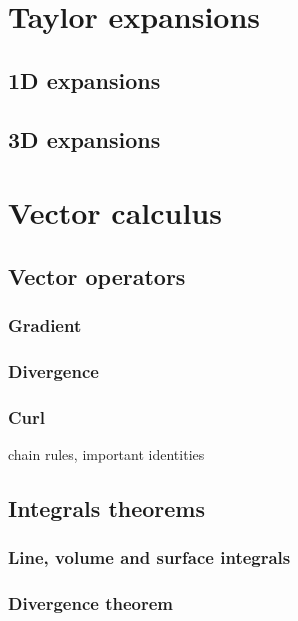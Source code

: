 \documentclass{article}
\begin{document}
\newpage

\section{Taylor expansions}

\subsection{1D expansions}

\newpage

\subsection{3D expansions}

\newpage

\section{Vector calculus}

\subsection{Vector operators}

\subsubsection{Gradient}

\subsubsection{Divergence}

\subsubsection{Curl}

chain rules, important identities

\subsection{Integrals theorems}

\subsubsection{Line, volume and surface integrals}

\subsubsection{Divergence theorem}
\end{document}

